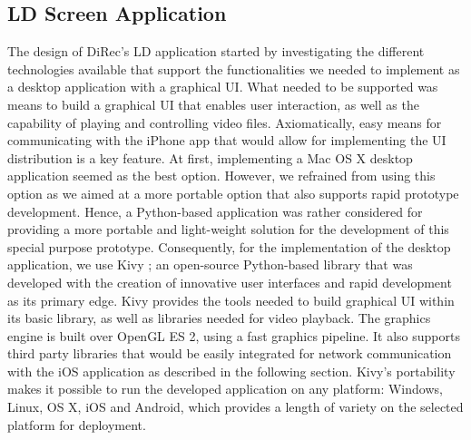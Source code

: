 \subsection{LD Screen Application}
The design of DiRec's LD application started by investigating the different
technologies available that support the functionalities we needed to implement
as a desktop application with a graphical UI. What needed to be supported was
means to build a graphical UI that enables user interaction, as well as the
capability of playing and controlling video files. Axiomatically, easy means for
communicating with the iPhone app that would allow for implementing the UI
distribution is a key feature. At first, implementing a Mac OS X desktop
application seemed as the best option. However, we refrained from using this
option as we aimed at a more portable option that also supports rapid prototype
development. Hence, a Python-based application was rather considered for
providing a more portable and light-weight solution for the development of this
special purpose prototype. Consequently, for the implementation of the desktop
application, we use Kivy \cite{kivyDoc}; an open-source Python-based library that was
developed with the creation of innovative user interfaces and rapid development
as its primary edge. Kivy provides the tools needed to build graphical UI within
its basic library, as well as libraries needed for video playback. The graphics
engine is built over OpenGL ES 2, using a fast graphics pipeline. It also
supports third party libraries that would be easily integrated for network
communication with the iOS application as described in the following section.
Kivy's portability makes it possible to run the developed application on any platform: Windows, Linux, OS X, iOS and Android, which provides a length of variety on the selected platform for deployment.
 
